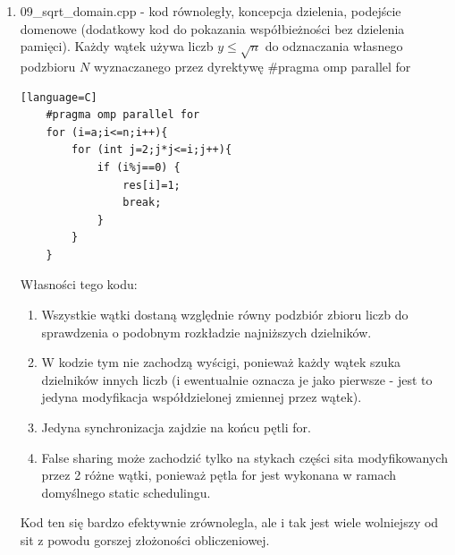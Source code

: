 \documentclass[12pt]{article}
\begin{document}
\begin {enumerate}
\begin{lstlisting}[style=mystyle, caption= Sito funkcyjne z dynamic schedulingiem][language=C]
	#pragma omp parallel
	{
		int thnum=omp_get_thread_num(), allth=omp_get_num_threads();
		int left=a+((n-a)/allth)*thnum, i, ji, j, finished=0, curfun=left;
		int right=left+(n-a)/allth-1;
		if (thnum==allth-1) right=n;
		if (left<=sq) left=sq+1;
		
		while (finished<ineo){
			curfun=curfun+outer;
			for (ji=0;ji<ineo;ji++){
				i=neoprimez[ji];
				if (dp[thnum][i]==0) dp[thnum][i]=max(modal(left, i), modal(a, i));
				for (j=dp[thnum][i]; j<curfun && j<=right;j+=i){
					p[j]=1;	
				}
				if (j>right) finished++;
				dp[thnum][i]=j;
			}
		}
	}
\end{lstlisting}
Jedyną fundamentalną różnicą pomiędzy tym kodem a zwykłym sitem domenowym jest unikanie cache missów i dążenie do trzymania w L1 cache jak największej części aktualnie używanego sita. Poza tym złożoność może się zwiększyć, a przynajmniej nie jestem w stanie dowieść standardowej złożoności sita. To rozwiązanie pozwala efektywnie zrównoleglić zadanie uzyskując CPI=0.331 i czas przetwarzania 0.4s dla \(l=1, r=10^9\) na 4 rdzeniach, co pokażą wyniki VTune'a.

	\item 09\_sqrt\_domain.cpp - kod równoległy, koncepcja dzielenia, podejście domenowe (dodatkowy kod do pokazania współbieżności bez dzielenia pamięci). Każdy wątek używa liczb \(y\le\sqrt{n}\) do odznaczania własnego podzbioru \(N\) wyznaczanego przez dyrektywę \#pragma omp parallel for
	\begin{lstlisting}[style=mystyle, caption= Sito funkcyjne z dynamic schedulingiem][language=C]
	#pragma omp parallel for
	for (i=a;i<=n;i++){
		for (int j=2;j*j<=i;j++){
			if (i%j==0) {
				res[i]=1;
				break;
			}
		}
	}
	\end{lstlisting}
	Własności tego kodu:
	\begin{enumerate}
		\item Wszystkie wątki dostaną względnie równy podzbiór zbioru liczb do sprawdzenia o podobnym rozkładzie najniższych dzielników.
		\item W kodzie tym nie zachodzą wyścigi, ponieważ każdy wątek szuka dzielników innych liczb (i ewentualnie oznacza je jako pierwsze - jest to jedyna modyfikacja współdzielonej zmiennej przez wątek).
		\item Jedyna synchronizacja zajdzie na końcu pętli for.
		\item False sharing może zachodzić tylko na stykach części sita modyfikowanych przez 2 różne wątki, ponieważ pętla for jest wykonana w ramach domyślnego static schedulingu.
	\end{enumerate}
	Kod ten się bardzo efektywnie zrównolegla, ale i tak jest wiele wolniejszy od sit z powodu gorszej złożoności obliczeniowej.
\end {enumerate}
\end{document}
